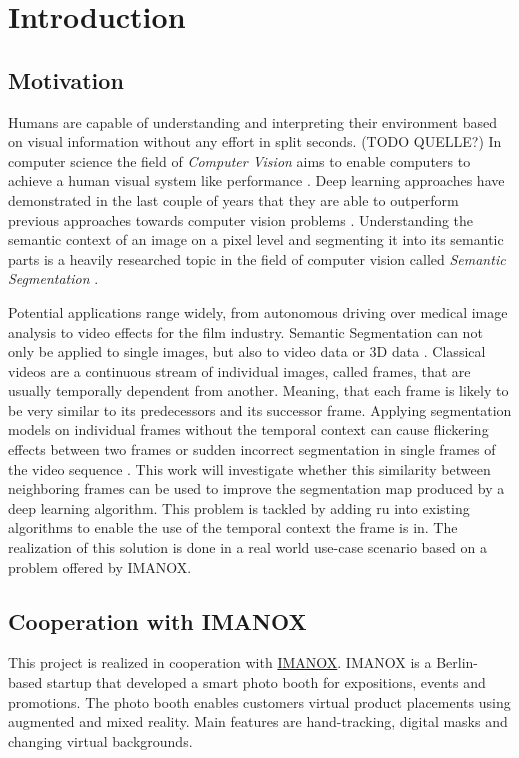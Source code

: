 \documentclass[11pt,
  paper=a4, 
  bibliography=totocnumbered,
	captions=tableheading,
	BCOR=10mm
]{scrreprt}
\theoremstyle{definition}
\begin{document}
\tableofcontents
\listoffigures
\listoftables
\listofequs


\chapter{Introduction}
\section{Motivation} \label{sec:Motivation}

Humans are capable of understanding and interpreting their environment based on visual information without any effort in split seconds. (TODO QUELLE?)
In computer science the field of \textit{Computer Vision} aims to enable computers to achieve a human visual system like performance \cite{Huang1997}.
Deep learning approaches have demonstrated in the last couple of years that they are able to outperform previous approaches towards computer vision problems \cite{Voulodimos2018, Garcia-Garcia2018}.
Understanding the semantic context of an image on a pixel level and segmenting it into its semantic parts is a heavily researched topic in the field of computer vision called \textit{Semantic Segmentation} \cite{Minaee2020, Forsyth2003}.

Potential applications range widely, from autonomous driving over medical image analysis \cite{Minaee2020} to video effects for the film industry.
Semantic Segmentation can not only be applied to single images, but also to video data or 3D data \cite{Garcia-Garcia2018}.
Classical videos are a continuous stream of individual images, called frames, that are usually temporally dependent from another.
Meaning, that each frame is likely to be very similar to its predecessors and its successor frame.
Applying segmentation models on individual frames without the temporal context can cause flickering effects between two frames or sudden incorrect segmentation in single frames of the video sequence \cite{Pfeuffer2_2019}.
This work will investigate whether this similarity between neighboring frames can be used to improve the segmentation map produced by a deep learning algorithm.
This problem is tackled by adding \gls{ru} into existing algorithms to enable the use of the temporal context the frame is in.
The realization of this solution is done in a real world use-case scenario based on a problem offered by IMANOX.

\section{Cooperation with IMANOX}\label{sec:Imanox}
This project is realized in cooperation with \href{https://www.Imanox.de/}{IMANOX}. 
IMANOX is a Berlin-based startup that developed a smart photo booth for expositions, events and promotions. 
The photo booth enables customers virtual product placements using augmented and mixed reality. 
Main features are hand-tracking, digital masks and changing virtual backgrounds.
\end{document}
